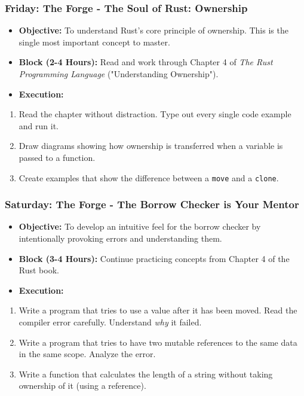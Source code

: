 \subsubsection{\textbf{Friday: The Forge - The Soul of Rust: Ownership}}
\begin{itemize}
  \item \textbf{Objective:} To understand Rust's core principle of ownership. This is the single most important concept to master.
  \item \textbf{Block (2-4 Hours):} Read and work through Chapter 4 of \textit{The Rust Programming Language} ("Understanding Ownership").
  \item \textbf{Execution:}
\end{itemize}
\begin{enumerate}
  \item Read the chapter without distraction. Type out every single code example and run it.
  \item Draw diagrams showing how ownership is transferred when a variable is passed to a function.
  \item Create examples that show the difference between a \texttt{move} and a \texttt{clone}.

\end{enumerate}
\subsubsection{\textbf{Saturday: The Forge - The Borrow Checker is Your Mentor}}
\begin{itemize}
  \item \textbf{Objective:} To develop an intuitive feel for the borrow checker by intentionally provoking errors and understanding them.
  \item \textbf{Block (3-4 Hours):} Continue practicing concepts from Chapter 4 of the Rust book.
  \item \textbf{Execution:}
\end{itemize}
\begin{enumerate}
  \item Write a program that tries to use a value after it has been moved. Read the compiler error carefully. Understand \textit{why} it failed.
  \item Write a program that tries to have two mutable references to the same data in the same scope. Analyze the error.
  \item Write a function that calculates the length of a string without taking ownership of it (using a reference).

\end{enumerate}
